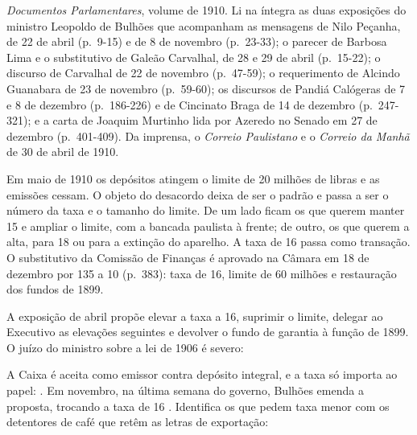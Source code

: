 

\textit{Documentos Parlamentares}, volume de 1910. Li na íntegra as duas
exposições do ministro Leopoldo de Bulhões que acompanham as mensagens de Nilo
Peçanha, de 22 de abril (p.~9-15) e de 8 de novembro (p.~23-33); o parecer de
Barbosa Lima e o substitutivo de Galeão Carvalhal, de 28 e 29 de abril
(p.~15-22); o discurso de Carvalhal de 22 de novembro (p.~47-59); o
requerimento de Alcindo Guanabara de 23 de novembro (p.~59-60); os discursos de
Pandiá Calógeras de 7 e 8 de dezembro (p.~186-226) e de Cincinato Braga de 14 de
dezembro (p.~247-321); e a carta de Joaquim Murtinho lida por Azeredo no Senado
em 27 de dezembro (p.~401-409). Da imprensa, o \textit{Correio Paulistano} e o
\textit{Correio da Manhã} de 30 de abril de 1910.


Em maio de 1910 os depósitos atingem o limite de 20 milhões de libras e as
emissões cessam. O objeto do desacordo deixa de ser o padrão e passa a ser o
número da taxa e o tamanho do limite. De um lado ficam os que querem manter 15
e ampliar o limite, com a bancada paulista à frente; de outro, os que querem a
alta, para 18 ou para a extinção do aparelho. A taxa de 16 passa como
transação. O substitutivo da Comissão de Finanças é aprovado na Câmara em 18 de
dezembro por 135 a 10 (p.~383): taxa de 16, limite de 60 milhões e restauração
dos fundos de 1899.


A exposição de abril propõe elevar a taxa a 16, suprimir o limite, delegar ao
Executivo as elevações seguintes e devolver o fundo de garantia à função de
1899. O juízo do ministro sobre a lei de 1906 é severo:


A Caixa é aceita como emissor contra depósito integral, e a taxa só importa ao
papel: 
. Em novembro, na última semana do governo, Bulhões emenda a
proposta, trocando a taxa de 16  . Identifica os que pedem taxa menor
com os detentores de café que retêm as letras de exportação:


